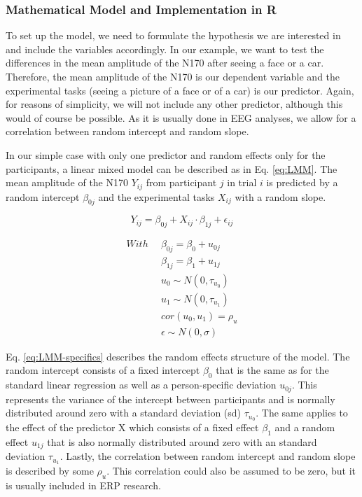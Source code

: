 \documentclass[
  doc,12pt,floatsintext]{apa7}
\begin{document}
\subsubsection{Mathematical Model and Implementation in R}\label{mathematical-model-and-implementation-in-r}

To set up the model, we need to formulate the hypothesis we are interested in and include the variables accordingly. In our example, we want to test the differences in the mean amplitude of the N170 after seeing a face or a car. Therefore, the mean amplitude of the N170 is our dependent variable and the experimental tasks (seeing a picture of a face or of a car) is our predictor. Again, for reasons of simplicity, we will not include any other predictor, although this would of course be possible. As it is usually done in EEG analyses, we allow for a correlation between random intercept and random slope.

In our simple case with only one predictor and random effects only for the participants, a linear mixed model can be described as in Eq. \eqref{eq:LMM}. The mean amplitude of the N170 \(Y_{ij}\) from participant \(j\) in trial \(i\) is predicted by a random intercept \(\beta_{0j}\) and the experimental tasks \(X_{ij}\) with a random slope.

\begin{equation} 
Y_{ij} = \beta_{0j} + X_{ij} \cdot \beta_{1j} + \epsilon_{ij}
\label{eq:LMM}
\end{equation}

\begin{equation} 
\begin{split}
With \enspace & \beta_{0j} = \beta_{0} + u_{0j} \\
& \beta_{1j} = \beta_{1} + u_{1j} \\
& u_0 \sim N(0, \tau_{u_0}) \\
& u_1 \sim N(0, \tau_{u_1}) \\
& cor(u_0, u_1) = \rho_u \\
& \epsilon \sim N(0, \sigma)
\end{split}
\label{eq:LMM-specifics}
\end{equation}

Eq. \eqref{eq:LMM-specifics} describes the random effects structure of the model. The random intercept consists of a fixed intercept \(\beta_{0}\) that is the same as for the standard linear regression as well as a person-specific deviation \(u_{0j}\). This represents the variance of the intercept between participants and is normally distributed around zero with a standard deviation (sd) \(\tau_{u_0}\). The same applies to the effect of the predictor X which consists of a fixed effect \(\beta_{1}\) and a random effect \(u_{1j}\) that is also normally distributed around zero with an standard deviation \(\tau_{u_1}\). Lastly, the correlation between random intercept and random slope is described by some \(\rho_u\). This correlation could also be assumed to be zero, but it is usually included in ERP research.
\end{document}
